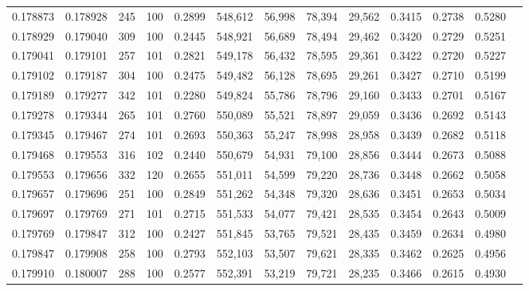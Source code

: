\begin{tabular}{rrrrrrrrrrrrr}
0.178873 & 0.178928 &   245 & 100 &                                     0.2899 & 548,612 &  56,998 &  78,394 &  29,562 & 0.3415 & 0.2738 & 0.5280 \\
0.178929 & 0.179040 &   309 & 100 &                                     0.2445 & 548,921 &  56,689 &  78,494 &  29,462 & 0.3420 & 0.2729 & 0.5251 \\
0.179041 & 0.179101 &   257 & 101 &                                     0.2821 & 549,178 &  56,432 &  78,595 &  29,361 & 0.3422 & 0.2720 & 0.5227 \\
0.179102 & 0.179187 &   304 & 100 &                                     0.2475 & 549,482 &  56,128 &  78,695 &  29,261 & 0.3427 & 0.2710 & 0.5199 \\
0.179189 & 0.179277 &   342 & 101 &                                     0.2280 & 549,824 &  55,786 &  78,796 &  29,160 & 0.3433 & 0.2701 & 0.5167 \\
0.179278 & 0.179344 &   265 & 101 &                                     0.2760 & 550,089 &  55,521 &  78,897 &  29,059 & 0.3436 & 0.2692 & 0.5143 \\
0.179345 & 0.179467 &   274 & 101 &                                     0.2693 & 550,363 &  55,247 &  78,998 &  28,958 & 0.3439 & 0.2682 & 0.5118 \\
0.179468 & 0.179553 &   316 & 102 &                                     0.2440 & 550,679 &  54,931 &  79,100 &  28,856 & 0.3444 & 0.2673 & 0.5088 \\
0.179553 & 0.179656 &   332 & 120 &                                     0.2655 & 551,011 &  54,599 &  79,220 &  28,736 & 0.3448 & 0.2662 & 0.5058 \\
0.179657 & 0.179696 &   251 & 100 &                                     0.2849 & 551,262 &  54,348 &  79,320 &  28,636 & 0.3451 & 0.2653 & 0.5034 \\
0.179697 & 0.179769 &   271 & 101 &                                     0.2715 & 551,533 &  54,077 &  79,421 &  28,535 & 0.3454 & 0.2643 & 0.5009 \\
0.179769 & 0.179847 &   312 & 100 &                                     0.2427 & 551,845 &  53,765 &  79,521 &  28,435 & 0.3459 & 0.2634 & 0.4980 \\
0.179847 & 0.179908 &   258 & 100 &                                     0.2793 & 552,103 &  53,507 &  79,621 &  28,335 & 0.3462 & 0.2625 & 0.4956 \\
0.179910 & 0.180007 &   288 & 100 &                                     0.2577 & 552,391 &  53,219 &  79,721 &  28,235 & 0.3466 & 0.2615 & 0.4930 \\

\end{tabular}
